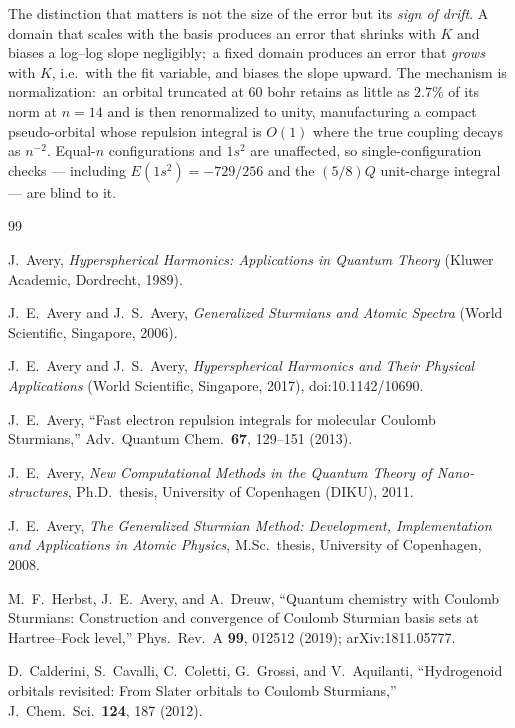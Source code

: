 \documentclass[aps,pra,twocolumn,superscriptaddress,longbibliography]{revtex4-2}
\begin{document}
The distinction that matters is not the size of the error but its \emph{sign of
drift}.  A domain that scales with the basis produces an error that shrinks with
$K$ and biases a log--log slope negligibly;\ a fixed domain produces an error
that \emph{grows} with $K$, i.e.\ with the fit variable, and biases the slope
upward.  The mechanism is normalization:\ an orbital truncated at $60$ bohr
retains as little as $2.7\%$ of its norm at $n=14$ and is then renormalized to
unity, manufacturing a compact pseudo-orbital whose repulsion integral is $O(1)$
where the true coupling decays as $n^{-2}$.  Equal-$n$ configurations and
$1s^{2}$ are unaffected, so single-configuration checks --- including
$E(1s^{2})=-729/256$ and the $(5/8)Q$ unit-charge integral --- are blind to it.

\begin{thebibliography}{99}

J.~Avery, \textit{Hyperspherical Harmonics: Applications in Quantum Theory}
(Kluwer Academic, Dordrecht, 1989).

J.~E.~Avery and J.~S.~Avery, \textit{Generalized Sturmians and Atomic Spectra}
(World Scientific, Singapore, 2006).

J.~E.~Avery and J.~S.~Avery, \textit{Hyperspherical Harmonics and Their
Physical Applications} (World Scientific, Singapore, 2017),
doi:10.1142/10690.

J.~E.~Avery, ``Fast electron repulsion integrals for molecular Coulomb
Sturmians,'' Adv.\ Quantum Chem.\ \textbf{67}, 129--151 (2013).

J.~E.~Avery, \textit{New Computational Methods in the Quantum Theory of
Nano-structures}, Ph.D.\ thesis, University of Copenhagen (DIKU), 2011.

J.~E.~Avery, \textit{The Generalized Sturmian Method: Development,
Implementation and Applications in Atomic Physics}, M.Sc.\ thesis, University of
Copenhagen, 2008.

M.~F.~Herbst, J.~E.~Avery, and A.~Dreuw,
``Quantum chemistry with Coulomb Sturmians: Construction and convergence of
Coulomb Sturmian basis sets at Hartree--Fock level,''
Phys.\ Rev.\ A \textbf{99}, 012512 (2019); arXiv:1811.05777.

D.~Calderini, S.~Cavalli, C.~Coletti, G.~Grossi, and V.~Aquilanti,
``Hydrogenoid orbitals revisited: From Slater orbitals to Coulomb Sturmians,''
J.\ Chem.\ Sci.\ \textbf{124}, 187 (2012).


\end{thebibliography}
\end{document}
